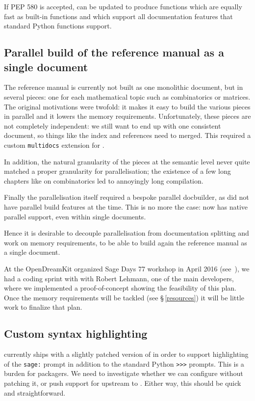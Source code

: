 \documentclass{deliverablereport}
\begin{document}
If PEP 580 is accepted, \Cython can be updated to produce
functions which are equally fast as built-in functions
and which support all documentation
features that standard Python functions support.

\subsection{Parallel build of the reference manual as a single document}\label{pieces}\label{parallel}

The \Sage reference manual is currently not built as one monolithic document,
but in several pieces:
one for each mathematical topic such as combinatorics or matrices.
The original motivations were twofold: it makes it easy to build the various pieces
in parallel and it lowers the memory requirements.
Unfortunately, these pieces are not completely independent:
we still want to end up with one consistent document,
so things like the index and references need to merged.
This required a custom \Sage \texttt{multidocs} extension for \Sphinx.

In addition, the natural granularity of the pieces at the semantic
level never quite matched a proper granularity for parallelisation;
the existence of a few long chapters like on combinatorics led to
annoyingly long compilation.

Finally the parallelisation itself required a bespoke parallel
docbuilder, as \Sphinx did not have parallel build features at the
time. This is no more the case: \Sphinx now has native parallel
support, even within single documents.

Hence it is desirable to decouple parallelisation from documentation
splitting and work on memory requirements, to be able to build again
the reference manual as a single document.

At the OpenDreamKit organized Sage Days 77 workshop in April 2016
(see~), we had a coding sprint with with
Robert Lehmann, one of the main \Sphinx developers, where we
implemented a proof-of-concept showing the feasibility of this plan.
Once the memory requirements will be tackled (see \S\,\ref{resources})
it will be little work to finalize that plan.

\subsection{Custom syntax highlighting}

\Sage currently ships with a slightly patched version of \Pygments in
order to support highlighting of the \texttt{sage:} prompt in addition
to the standard Python \texttt{>>>} prompts. This is a burden for
packagers. We need to investigate whether we can configure \Pygments
without patching it, or push support for \Sage upstream to \Pygments.
Either way, this should be quick and straightforward.
\end{document}
